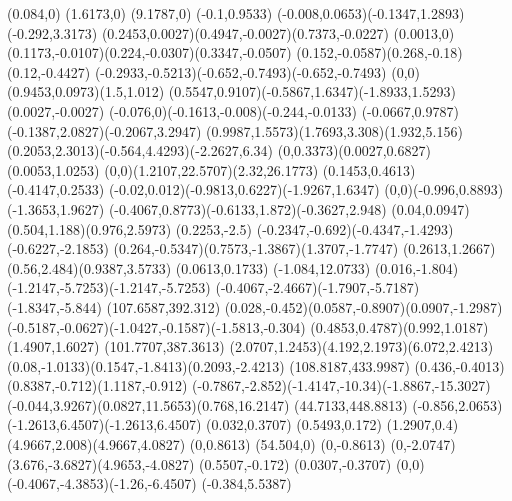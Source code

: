 {    \rlineto(0.084,0)
    \rlineto(1.6173,0)
    \rlineto(9.1787,0)
    \rlineto(-0.1,0.9533)
    \rcurveto(-0.008,0.0653)(-0.1347,1.2893)(-0.292,3.3173)
    \rcurveto(0.2453,0.0027)(0.4947,-0.0027)(0.7373,-0.0227)
    \rlineto(0.0013,0)
    \rcurveto(0.1173,-0.0107)(0.224,-0.0307)(0.3347,-0.0507)
    \rcurveto(0.152,-0.0587)(0.268,-0.18)(0.12,-0.4427)
    \rcurveto(-0.2933,-0.5213)(-0.652,-0.7493)(-0.652,-0.7493)
    \rcurveto(0,0)(0.9453,0.0973)(1.5,1.012)
    \rcurveto(0.5547,0.9107)(-0.5867,1.6347)(-1.8933,1.5293)
    \rlineto(0.0027,-0.0027)
    \rcurveto(-0.076,0)(-0.1613,-0.008)(-0.244,-0.0133)
    \rcurveto(-0.0667,0.9787)(-0.1387,2.0827)(-0.2067,3.2947)
    \rcurveto(0.9987,1.5573)(1.7693,3.308)(1.932,5.156)
    \rcurveto(0.2053,2.3013)(-0.564,4.4293)(-2.2627,6.34)
    \rcurveto(0,0.3373)(0.0027,0.6827)(0.0053,1.0253)
    \rcurveto(0,0)(1.2107,22.5707)(2.32,26.1773)
    \rlineto(0.1453,0.4613)
    \rlineto(-0.4147,0.2533)
    \rcurveto(-0.02,0.012)(-0.9813,0.6227)(-1.9267,1.6347)
    \rcurveto(0,0)(-0.996,0.8893)(-1.3653,1.9627)
    \rcurveto(-0.4067,0.8773)(-0.6133,1.872)(-0.3627,2.948)
    \rcurveto(0.04,0.0947)(0.504,1.188)(0.976,2.5973)
    \rlineto(0.2253,-2.5)
    \rcurveto(-0.2347,-0.692)(-0.4347,-1.4293)(-0.6227,-2.1853)
    \rcurveto(0.264,-0.5347)(0.7573,-1.3867)(1.3707,-1.7747)
    \rcurveto(0.2613,1.2667)(0.56,2.484)(0.9387,3.5733)
    \rlineto(0.0613,0.1733)
    \rlineto(-1.084,12.0733)
    \rcurveto(0.016,-1.804)(-1.2147,-5.7253)(-1.2147,-5.7253)
    \rcurveto(-0.4067,-2.4667)(-1.7907,-5.7187)(-1.8347,-5.844)
    \moveto(107.6587,392.312)
    \rcurveto(0.028,-0.452)(0.0587,-0.8907)(0.0907,-1.2987)
    \rcurveto(-0.5187,-0.0627)(-1.0427,-0.1587)(-1.5813,-0.304)
    \rcurveto(0.4853,0.4787)(0.992,1.0187)(1.4907,1.6027)
    \moveto(101.7707,387.3613)
    \rcurveto(2.0707,1.2453)(4.192,2.1973)(6.072,2.4213)
    \rcurveto(0.08,-1.0133)(0.1547,-1.8413)(0.2093,-2.4213)
    \closepath
    \moveto(108.8187,433.9987)
    \rcurveto(0.436,-0.4013)(0.8387,-0.712)(1.1187,-0.912)
    \rcurveto(-0.7867,-2.852)(-1.4147,-10.34)(-1.8867,-15.3027)
    \rcurveto(-0.044,3.9267)(0.0827,11.5653)(0.768,16.2147)
    \moveto(44.7133,448.8813)
    \rcurveto(-0.856,2.0653)(-1.2613,6.4507)(-1.2613,6.4507)
    \rlineto(0.032,0.3707)
    \rlineto(0.5493,0.172)
    \rcurveto(1.2907,0.4)(4.9667,2.008)(4.9667,4.0827)
    \rlineto(0,0.8613)
    \rlineto(54.504,0)
    \rlineto(0,-0.8613)
    \rcurveto(0,-2.0747)(3.676,-3.6827)(4.9653,-4.0827)
    \rlineto(0.5507,-0.172)
    \rlineto(0.0307,-0.3707)
    \rcurveto(0,0)(-0.4067,-4.3853)(-1.26,-6.4507)
    \rlineto(-0.384,5.5387)
}
